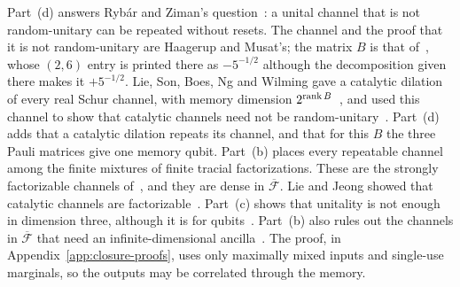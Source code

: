 Part~(d) answers Ryb\'ar and Ziman's
question~\cite[Section~IV]{RybarZiman2008}: a unital channel that is not
random-unitary can be repeated without resets. The channel and the proof
that it is not random-unitary are Haagerup and Musat's; the matrix $B$ is
that of~\cite[Example~3.3]{HaagerupMusat2011}, whose $(2,6)$ entry is
printed there as $-5^{-1/2}$ although the decomposition given there makes
it $+5^{-1/2}$. Lie, Son, Boes, Ng and Wilming gave a catalytic dilation
of every real Schur channel, with memory dimension
$2^{\operatorname{rank} B}$~\cite[Proposition~15]{LieSonBoesNgWilming2026}, and used
this channel to show that catalytic channels need not be
random-unitary~\cite[Appendix~C]{LieSonBoesNgWilming2026}. Part~(d) adds
that a catalytic dilation repeats its channel, and that for this $B$ the
three Pauli matrices give one memory qubit. Part~(b)
places every repeatable channel among the finite mixtures of finite
tracial factorizations. These are the strongly factorizable channels
of~\cite{LieSonBoesNgWilming2026}, and they are dense in
$\overline{\mathcal F}$. Lie and Jeong showed that catalytic channels are
factorizable~\cite{LieJeong2021}. Part~(c) shows that unitality is not
enough in dimension three, although it is for
qubits~\cite[Section~IV]{RybarZiman2008}. Part~(b) also rules out the
channels in $\overline{\mathcal F}$ that need an infinite-dimensional
ancilla~\cite[Theorem~4.1]{MusatRordam2019}. The proof, in
Appendix~\ref{app:closure-proofs}, uses only maximally mixed inputs and
single-use marginals, so the outputs may be correlated through the
memory.
